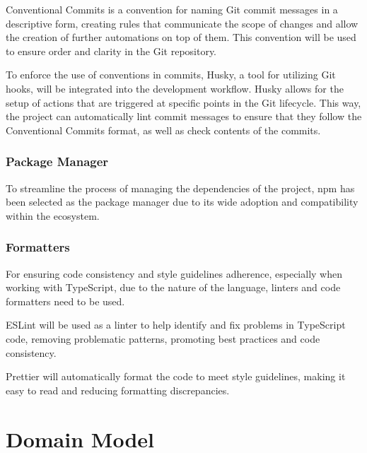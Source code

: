 Conventional Commits is a convention for naming Git commit messages in a descriptive form, creating rules that communicate the scope of changes and allow the creation of further automations on top of them. This convention will be used to ensure order and clarity in the Git repository.~\cite{ConventionalCommits}

To enforce the use of conventions in commits, Husky, a tool for utilizing Git hooks, will be integrated into the development workflow. Husky allows for the setup of actions that are triggered at specific points in the Git lifecycle. This way, the project can automatically lint commit messages to ensure that they follow the Conventional Commits format, as well as check contents of the commits.~\cite{Husky}

\subsubsection{Package Manager}

To streamline the process of managing the dependencies of the project, npm has been selected as the package manager due to its wide adoption and compatibility within the ecosystem. \cite{Abramowski2022}

\subsubsection{Formatters}

For ensuring code consistency and style guidelines adherence, especially when working with TypeScript, due to the nature of the language, linters and code formatters need to be used.

ESLint will be used as a linter to help identify and fix problems in TypeScript code, removing problematic patterns, promoting best practices and code consistency. \cite{Gupta2021}

Prettier will automatically format the code to meet style guidelines, making it easy to read and reducing formatting discrepancies. \cite{Wojtasinski2023}


\section{Domain Model} \label{section:domain-model}

